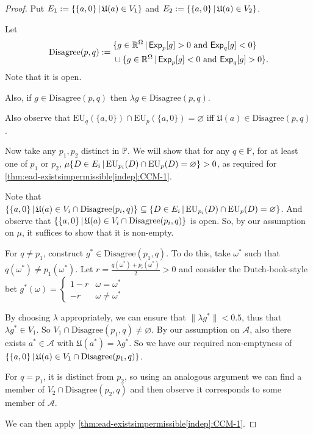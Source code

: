 \documentclass[a4paper]{article}
\newcommand\A{\mathcal{A}}
\renewcommand\P{\mathbb{P}} %
\newcommand\Exp{\mathsf{Exp}}
\newcommand\EU{\mathrm{EU}}
\newcommand\U{\mathfrak{U}} %
\newcommand{\IP}{\P}
\renewcommand{\Re}{\mathbb{R}}
\renewcommand{\color}[1]{}
\newenvironment{colored}[1]{\leavevmode\color{#1}}{}
\newcommand\SetDelimiter[1][]{
	\nonscript\,#1\vert \allowbreak \nonscript\,\mathopen{}}
\providecommand\given{\SetDelimiter}
\renewcommand{\emptyset}{\varnothing}
\newenvironment{CCM rewritten}
{\begingroup\color{blue}} %
{\endgroup}              %
\begin{document}
\begin{proof}
\begin{colored}{red}
	Put $E_1:=\{\{a,0\}\given \U(a)\in V_1\}$ and $E_2:=\{\{a,0\}\given \U(a) \in V_2\}$. 
	
	
	Let \begin{equation}
		\mathrm{Disagree}(p,q):=
		\begin{split}&
		\{g\in\Re^\Omega\given \Exp_p[g]>0\text{ and }\Exp_q[g]<0\}\\
		&\cup\{g\in\Re^\Omega\given \Exp_p[g]<0\text{ and }\Exp_q[g]>0\}.
	\end{split}
	\end{equation}
	Note that it is open. 
	
	Also, if $g\in \mathrm{Disagree}(p,q)$ then $\lambda g\in\mathrm{Disagree}(p,q)$.	
	
	Also observe that $\EU_{q}(\{a,0\})\cap \EU_{p}(\{a,0\})=\emptyset$ iff $\U(a)\in \mathrm{Disagree}(p,q)$.
	
	Now take any $p_1,p_2$ distinct in $\IP$. We will show that for any $q\in\IP$, for at least one of $p_1$ or $p_2$, $\mu \{D\in E_i\given \EU_{p_i}(D)\cap \EU_p(D)= \emptyset\}>0$, as required for \cref{thm:ead-existsimpermissible[indep]:CCM-1}. 
	
	Note that $\{\{a,0\}\given \U(a)\in V_i\cap \mathrm{Disagree}(p_i,q)\}\subseteq \{D\in E_i\given \EU_{p_i}(D)\cap \EU_p(D)= \emptyset\}$. 
	And observe that $\{\{a,0\}\given \U(a)\in V_i\cap \mathrm{Disagree}(p_i,q)\}$ is open. So, by our assumption on $\mu$, it suffices to show that it is non-empty. 
	
	For $q\neq p_1$, construct $g^*\in \mathrm{Disagree}(p_1,q)$. To do this, take $\omega^*$ such that $q(\omega^*)\neq p_1(\omega^*)$. 
	Let $r=\frac{q(\omega^*)+p_i(\omega^*)}{2}>0$ and consider the Dutch-book-style bet $g^*(\omega)=\begin{cases}
		1-r&\omega=\omega^*\\
		-r&\omega\neq \omega^*
	\end{cases}$
	
	By choosing $\lambda$ appropriately, we can ensure that $\|\lambda g^*\|<0.5$, thus that $\lambda g^*\in V_1$. So $V_1\cap \mathrm{Disagree}(p_1,q)\neq\emptyset$. 
	By our assumption on $\A$, also there exists $a^*\in\A$ with $\U(a^*)=\lambda g^*$. 
	So we have our required non-emptyness of $\{\{a,0\}\given \U(a)\in V_1\cap \mathrm{Disagree}(p_1,q)\}$.
	
	For $q=p_1$, it is distinct from $p_2$, so using an analogous argument we can find a member of $V_2\cap \mathrm{Disagree}(p_2,q)$ and then observe it corresponds to some member of $\A$. 
	
	We can then apply \cref{thm:ead-existsimpermissible[indep]:CCM-1}.
	\end{colored}
\end{proof}
\end{document}
